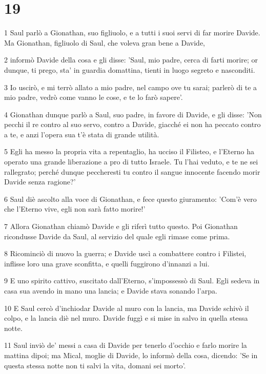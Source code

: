 \chapter{19}

\par 1 Saul parlò a Gionathan, suo figliuolo, e a tutti i suoi servi di far morire Davide. Ma Gionathan, figliuolo di Saul, che voleva gran bene a Davide,
\par 2 informò Davide della cosa e gli disse: 'Saul, mio padre, cerca di farti morire; or dunque, ti prego, sta' in guardia domattina, tienti in luogo segreto e nasconditi.
\par 3 Io uscirò, e mi terrò allato a mio padre, nel campo ove tu sarai; parlerò di te a mio padre, vedrò come vanno le cose, e te lo farò sapere'.
\par 4 Gionathan dunque parlò a Saul, suo padre, in favore di Davide, e gli disse: 'Non pecchi il re contro al suo servo, contro a Davide, giacché ei non ha peccato contro a te, e anzi l'opera sua t'è stata di grande utilità.
\par 5 Egli ha messo la propria vita a repentaglio, ha ucciso il Filisteo, e l'Eterno ha operato una grande liberazione a pro di tutto Israele. Tu l'hai veduto, e te ne sei rallegrato; perché dunque peccheresti tu contro il sangue innocente facendo morir Davide senza ragione?'
\par 6 Saul diè ascolto alla voce di Gionathan, e fece questo giuramento: 'Com'è vero che l'Eterno vive, egli non sarà fatto morire!'
\par 7 Allora Gionathan chiamò Davide e gli riferì tutto questo. Poi Gionathan ricondusse Davide da Saul, al servizio del quale egli rimase come prima.
\par 8 Ricominciò di nuovo la guerra; e Davide uscì a combattere contro i Filistei, inflisse loro una grave sconfitta, e quelli fuggirono d'innanzi a lui.
\par 9 E uno spirito cattivo, suscitato dall'Eterno, s'impossessò di Saul. Egli sedeva in casa sua avendo in mano una lancia; e Davide stava sonando l'arpa.
\par 10 E Saul cercò d'inchiodar Davide al muro con la lancia, ma Davide schivò il colpo, e la lancia diè nel muro. Davide fuggì e si mise in salvo in quella stessa notte.
\par 11 Saul inviò de' messi a casa di Davide per tenerlo d'occhio e farlo morire la mattina dipoi; ma Mical, moglie di Davide, lo informò della cosa, dicendo: 'Se in questa stessa notte non ti salvi la vita, domani sei morto'.
